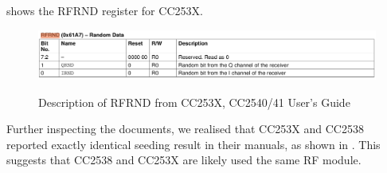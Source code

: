  shows the RFRND register for CC253X.

\begin{figure}
\center
\caption{Description of RFRND from CC253X, CC2540/41 User's Guide}
\includegraphics[width=\linewidth]{./figures/CC253X_RFRND.png}
\label{CC253X_RFRND}
\end{figure}

Further inspecting the documents, we realised that CC253X and CC2538 reported exactly identical seeding result in their manuals, as shown in . This suggests that CC2538 and CC253X are likely used the same RF module.

